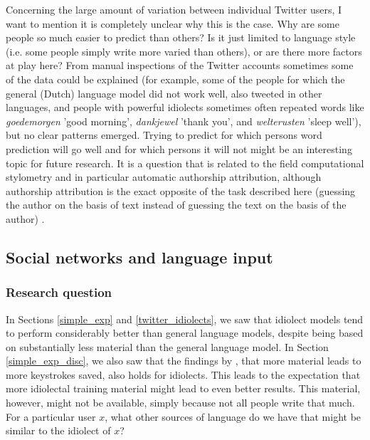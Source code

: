 \documentclass[11pt]{article}
\begin{document}
Concerning the large amount of variation between individual Twitter users, I want to mention it is completely unclear why this is the case. Why are some people so much easier to predict than others? Is it just limited to language style (i.e. some people simply write more varied than others), or are there more factors at play here? From manual inspections of the Twitter accounts sometimes some of the data could be explained (for example, some of the people for which the general (Dutch) language model did not work well, also tweeted in other languages, and people with powerful idiolects sometimes often repeated words like \emph{goedemorgen} 'good morning', \emph{dankjewel} 'thank you', and \emph{welterusten} 'sleep well'), but no clear patterns emerged. Trying to predict for which persons word prediction will go well and for which persons it will not might be an interesting topic for future research. It is a question that is related to the field computational stylometry and in particular automatic authorship attribution, although authorship attribution is the exact opposite of the task described here (guessing the author on the basis of text instead of guessing the text on the basis of the author) .

\subsection{Social networks and language input} \label{input_networks}

\subsubsection{Research question}
In Sections \ref{simple_exp} and \ref{twitter_idiolects}, we saw that idiolect models tend to perform considerably better than general language models, despite being based on substantially less material than the general language model. In Section \ref{simple_exp_disc}, we also saw that the findings by , that more material leads to more keystrokes saved, also holds for idiolects. This leads to the expectation that more idiolectal training material might lead to even better results. This material, however, might not be available, simply because not all people write that much. For a particular user $x$, what other sources of language do we have that might be similar to the idiolect of $x$?
\end{document}
